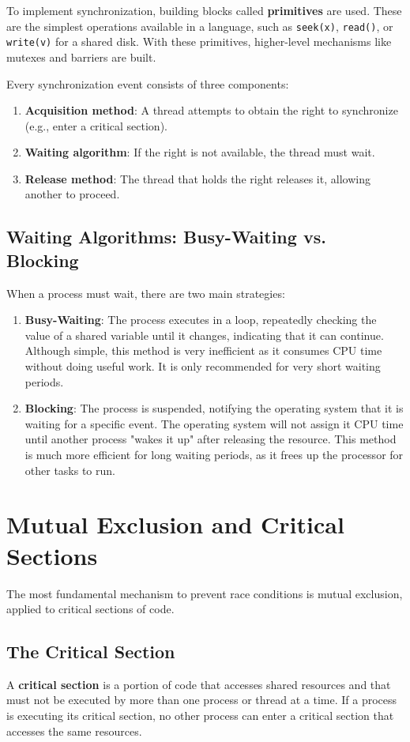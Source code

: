 To implement synchronization, building blocks called \textbf{primitives} are used. These are the simplest operations available in a language, such as \texttt{seek(x)}, \texttt{read()}, or \texttt{write(v)} for a shared disk. With these primitives, higher-level mechanisms like mutexes and barriers are built.

Every synchronization event consists of three components:
\begin{enumerate}
    \item \textbf{Acquisition method}: A thread attempts to obtain the right to synchronize (e.g., enter a critical section).
    \item \textbf{Waiting algorithm}: If the right is not available, the thread must wait.
    \item \textbf{Release method}: The thread that holds the right releases it, allowing another to proceed.
\end{enumerate}

\subsection{Waiting Algorithms: Busy-Waiting vs. Blocking}
When a process must wait, there are two main strategies:
\begin{enumerate}
    \item \textbf{Busy-Waiting}: The process executes in a loop, repeatedly checking the value of a shared variable until it changes, indicating that it can continue. Although simple, this method is very inefficient as it consumes CPU time without doing useful work. It is only recommended for very short waiting periods.
    \item \textbf{Blocking}: The process is suspended, notifying the operating system that it is waiting for a specific event. The operating system will not assign it CPU time until another process "wakes it up" after releasing the resource. This method is much more efficient for long waiting periods, as it frees up the processor for other tasks to run.
\end{enumerate}

\section{Mutual Exclusion and Critical Sections}
The most fundamental mechanism to prevent race conditions is mutual exclusion, applied to critical sections of code.

\subsection{The Critical Section}
A \textbf{critical section} is a portion of code that accesses shared resources and that must not be executed by more than one process or thread at a time. If a process is executing its critical section, no other process can enter a critical section that accesses the same resources.


